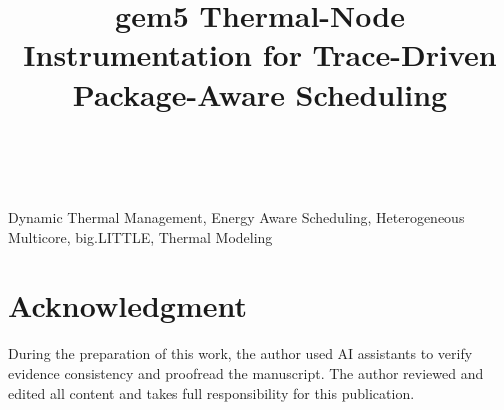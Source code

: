 \documentclass[journal,10pt,letterpaper]{IEEEtran}
\begin{document}
\title{gem5 Thermal-Node Instrumentation for Trace-Driven Package-Aware Scheduling}

\author{\\
}

\maketitle



\begin{IEEEkeywords}
Dynamic Thermal Management, Energy Aware Scheduling, Heterogeneous Multicore, big.LITTLE, Thermal Modeling
\end{IEEEkeywords}








\section*{Acknowledgment}
During the preparation of this work, the author used AI assistants to verify evidence consistency and proofread the manuscript. The author reviewed and edited all content and takes full responsibility for this publication.



\end{document}
